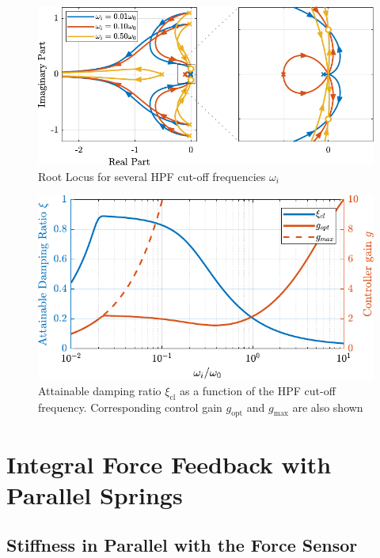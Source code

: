 \documentclass{ISMA_USD2020}
\begin{document}
\begin{figure}[htbp]
\centering
\includegraphics[scale=1]{figs/root_locus_wi_modified_iff.pdf}
\caption{\label{fig:root_locus_wi_modified_iff}Root Locus for several HPF cut-off frequencies \(\omega_i\)}
\end{figure}

\begin{figure}[htbp]
\centering
\includegraphics[scale=1]{figs/mod_iff_damping_wi.pdf}
\caption{\label{fig:mod_iff_damping_wi}Attainable damping ratio \(\xi_\text{cl}\) as a function of the HPF cut-off frequency. Corresponding control gain \(g_\text{opt}\) and \(g_\text{max}\) are also shown}
\end{figure}

\section{Integral Force Feedback with Parallel Springs}
\label{sec:org22884d6}
\subsection{Stiffness in Parallel with the Force Sensor}
\label{sec:orgb871bfd}
\end{document}
